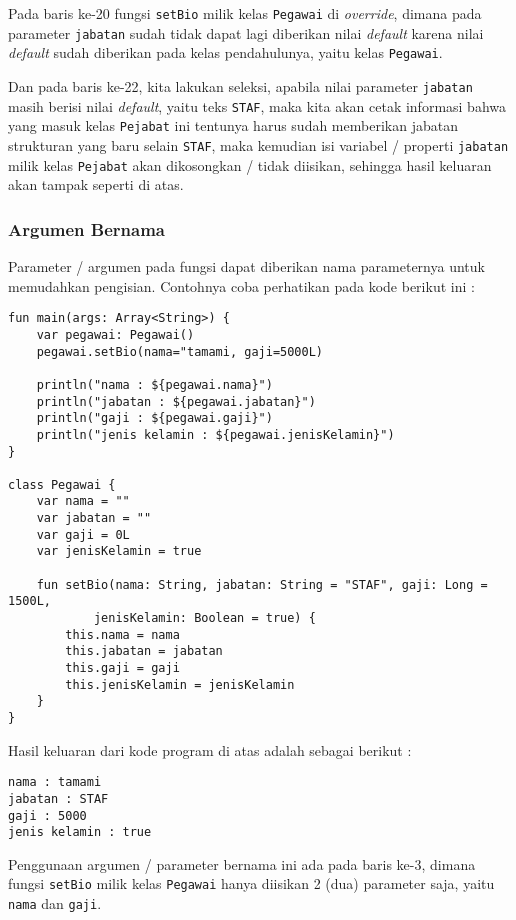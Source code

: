 Pada baris ke-20 fungsi \texttt{setBio} milik kelas \texttt{Pegawai} di \textit{override}, dimana pada parameter \texttt{jabatan} sudah tidak dapat lagi diberikan nilai \textit{default} karena nilai \textit{default} sudah diberikan pada kelas pendahulunya, yaitu kelas \texttt{Pegawai}.

Dan pada baris ke-22, kita lakukan seleksi, apabila nilai parameter \texttt{jabatan} masih berisi nilai \textit{default}, yaitu teks \texttt{STAF}, maka kita akan cetak informasi bahwa yang masuk kelas \texttt{Pejabat} ini tentunya harus sudah memberikan jabatan strukturan yang baru selain \texttt{STAF}, maka kemudian isi variabel / properti \texttt{jabatan} milik kelas \texttt{Pejabat} akan dikosongkan / tidak diisikan, sehingga hasil keluaran akan tampak seperti di atas.

\subsubsection{Argumen Bernama}

Parameter / argumen pada fungsi dapat diberikan nama parameternya untuk memudahkan pengisian. Contohnya coba perhatikan pada kode berikut ini :

\begin{lstlisting}
fun main(args: Array<String>) {
	var pegawai: Pegawai() 
	pegawai.setBio(nama="tamami, gaji=5000L) 
	
	println("nama : ${pegawai.nama}")
	println("jabatan : ${pegawai.jabatan}")
	println("gaji : ${pegawai.gaji}")
	println("jenis kelamin : ${pegawai.jenisKelamin}")
}

class Pegawai {
	var nama = ""
	var jabatan = ""
	var gaji = 0L
	var jenisKelamin = true
	
	fun setBio(nama: String, jabatan: String = "STAF", gaji: Long = 1500L,
			jenisKelamin: Boolean = true) {
		this.nama = nama
		this.jabatan = jabatan
		this.gaji = gaji
		this.jenisKelamin = jenisKelamin
	}
}
\end{lstlisting}

Hasil keluaran dari kode program di atas adalah sebagai berikut :

\begin{lstlisting}
nama : tamami
jabatan : STAF
gaji : 5000
jenis kelamin : true
\end{lstlisting}

Penggunaan argumen / parameter bernama ini ada pada baris ke-3, dimana fungsi \texttt{setBio} milik kelas \texttt{Pegawai} hanya diisikan 2 (dua) parameter saja, yaitu \texttt{nama} dan \texttt{gaji}.

